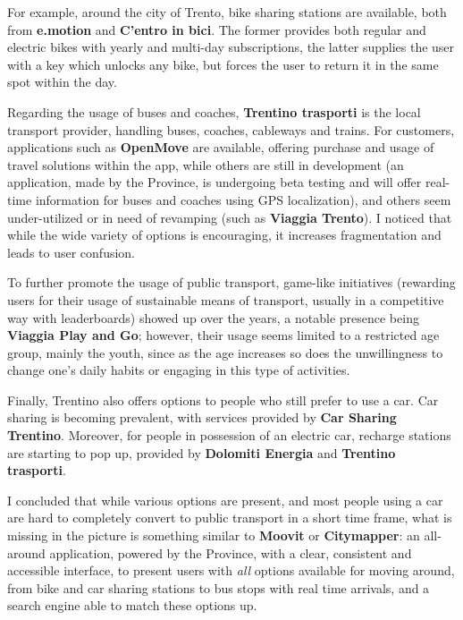 \documentclass[11pt]{article}
\begin{document}
For example, around the city of Trento, bike sharing stations are available, both from \textbf{e.motion} and \textbf{C'entro in bici}. The former provides both regular and electric bikes with yearly and multi-day subscriptions, the latter supplies the user with a key which unlocks any bike, but forces the user to return it in the same spot within the day.

Regarding the usage of buses and coaches, \textbf{Trentino trasporti} is the local transport provider, handling buses, coaches, cableways and trains. For customers, applications such as \textbf{OpenMove} are available, offering purchase and usage of travel solutions within the app, while others are still in development (an application, made by the Province, is undergoing beta testing and will offer real-time information for buses and coaches using GPS localization), and others seem under-utilized or in need of revamping (such as \textbf{Viaggia Trento}). I noticed that while the wide variety of options is encouraging, it increases fragmentation and leads to user confusion.

To further promote the usage of public transport, game-like initiatives (rewarding users for their usage of sustainable means of transport, usually in a competitive way with leaderboards) showed up over the years, a notable presence being \textbf{Viaggia Play and Go}; however, their usage seems limited to a restricted age group, mainly the youth, since as the age increases so does the unwillingness to change one's daily habits or engaging in this type of activities.

Finally, Trentino also offers options to people who still prefer to use a car. Car sharing is becoming prevalent, with services provided by \textbf{Car Sharing Trentino}. Moreover, for people in possession of an electric car, recharge stations are starting to pop up, provided by \textbf{Dolomiti Energia} and \textbf{Trentino trasporti}.

I concluded that while various options are present, and most people using a car are hard to completely convert to public transport in a short time frame, what is missing in the picture is something similar to \textbf{Moovit} or \textbf{Citymapper}: an all-around application, powered by the Province, with a clear, consistent and accessible interface, to present users with \textit{all} options available for moving around, from bike and car sharing stations to bus stops with real time arrivals, and a search engine able to match these options up.
\end{document}
